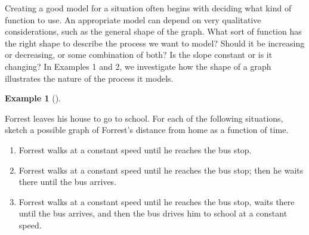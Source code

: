 \documentclass[10pt,]{book}
\theoremstyle{plain}
\theoremstyle{definition}
\theoremstyle{definition}
\newtheorem{example}[theorem]{Example}
\numberwithin{equation}{section}
\begin{document}
    Creating a good model for a situation often begins with deciding what kind of function to use. An appropriate model can depend on very qualitative considerations, such as the general shape of the graph. What sort of function has the right shape to describe the process we want to model? Should it be increasing or decreasing, or some combination of both? Is the slope constant or is it changing? In Examples 1 and 2, we investigate how the shape of a graph illustrates the nature of the process it models.
%
\begin{example}[]\label{example-home-to-school}

        Forrest leaves his house to go to school. For each of the following situations, sketch a possible graph of Forrest's distance from home as a function of time.
        \leavevmode%
\begin{enumerate}[label=*\alph**]
\item\hypertarget{li-317}{}Forrest walks at a constant speed until he reaches the bus stop.\item\hypertarget{li-318}{}Forrest walks at a constant speed until he reaches the bus stop; then he waits there until the bus arrives.\item\hypertarget{li-319}{}Forrest walks at a constant speed until he reaches the bus stop, waits there until the bus arrives, and then the bus drives him to school at a constant speed.\end{enumerate}


\end{example}
\end{document}
